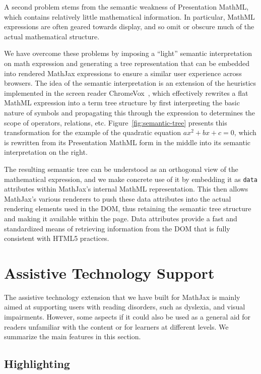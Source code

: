 \documentclass{sig-alternate}
\begin{document}
A second problem stems from the semantic weakness of Presentation MathML,
which contains relatively little mathematical information. In particular, MathML
expressions are often geared towards display, and so omit or obscure much of
the actual mathematical structure.

We have overcome these problems by imposing a ``light'' semantic interpretation
on math expression and generating a tree representation that can be embedded
into rendered MathJax expressions to ensure a similar user experience across
browsers. The idea of the semantic interpretation is an extension of the
heuristics implemented in the screen reader ChromeVox~\cite{Sorge14}, which
effectively rewrites a flat MathML expression into a term tree structure by first
interpreting the basic nature of symbols and propagating this through the
expression to determines the scope of operators, relations, etc.
Figure~\ref{fig:semantic-tree} presents this transformation for the example of
the quadratic equation $ax^2 + bx + c = 0$, which is rewritten from its
Presentation MathML form in the middle into its semantic interpretation on the
right.

The resulting semantic tree can be understood as an orthogonal view of the mathematical
expression, and we make concrete use of it by embedding it as \texttt{data}
attributes within MathJax's internal MathML representation. This then allows
MathJax's various renderers to push these data attributes into the actual
rendering elements used in the DOM, thus retaining the semantic tree structure
and making it available within the page.
Data attributes provide a fast and standardized means of retrieving information
from the DOM that is fully consistent with HTML5 practices.


\section{Assistive Technology Support}
\label{sec:at-solution}


The assistive technology extension that we have built for MathJax is mainly
aimed at supporting users with reading disorders, such as dyslexia, and visual
impairments. However, some aspects if it could also be used as a general aid for readers
unfamiliar with the content or for learners at different levels. We summarize the
main features in this section.

\subsection{Highlighting}
\end{document}
